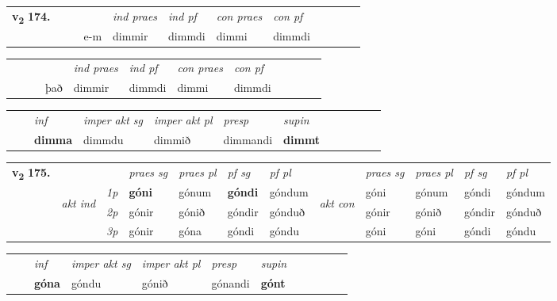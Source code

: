 \begin{tabular}{llllllllllll}\toprule
\multirow{4}{*}{{{\textbf{v{\textsubscript{2}}} \Large{\textbf{174.}}}}}  & &  & &  \textit{ind praes} & \textit{ind pf} & \textit{con praes} & \textit{con pf} \\*
&  & & e-m & dimmir & dimmdi & dimmi & dimmdi \\*
\cmidrule{5-9}
\end{tabular}


\begin{tabular}{llllllllllll}
 & &  & &  \textit{ind praes} & \textit{ind pf} & \textit{con praes} & \textit{con pf} \\*
&  & & það & dimmir & dimmdi & dimmi & dimmdi \\*
\cmidrule{5-9}
\end{tabular}


\begin{tabular}{llllllllllll}
 & & \textit{inf} & \textit{imper akt sg} & \textit{imper akt pl}   & \textit{presp} & \textit{supin}       \\*
  & & \textbf{dimma} & dimmdu  & dimmið   & dimmandi &  \textbf{dimmt}   \\*
\cmidrule{1-12}
\end{tabular}



\begin{tabular}{llllllllllll} \toprule
\multirow{4}{*}{{{\textbf{v{\textsubscript{2}}} \Large{\textbf{175.}}}}}  & &   &  \textit{praes sg}  & \textit{praes pl}  &\textit{ pf sg} & \textit{pf pl} &  &  \textit{praes sg}  & \textit{praes pl}  & \textit{pf sg} & \textit{pf pl } \\*
	\cmidrule{4-7} \cmidrule{9-12}
 & \multirow{3}{*}{\begin{turn}{90}\textit{akt ind}\end{turn}} & {\textit{1p}} & \textbf{góni} & gónum    & \textbf{góndi} & góndum & \multirow{3}{*}{\begin{turn}{90}\textit{akt con}\end{turn}} &góni & gónum & góndi & góndum\\*
& &  {\textit{2p}} &  gónir  & gónið   & góndir & gónduð & & gónir & gónið & góndir & gónduð \\*
& &  {\textit{3p}} & gónir & góna   & góndi & góndu & & góni & góni& góndi & góndu  \\*
\cmidrule{4-7} \cmidrule{9-12}
\end{tabular}


\begin{tabular}{llllllllllll}
 & & \textit{inf} & \textit{imper akt sg} & \textit{imper akt pl}   & \textit{presp} & \textit{supin}       \\*
  & & \textbf{góna} & góndu  & gónið   & gónandi &  \textbf{gónt}   \\*
\cmidrule{1-12}
\end{tabular}



